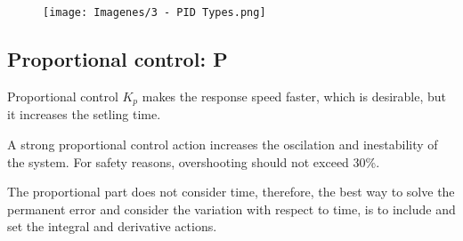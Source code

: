 \begin{figure}[H]
    \centering
    \texttt{[image: Imagenes/3 - PID Types.png]}
\end{figure}

\subsection{Proportional control: P}
Proportional control $K_p$ makes the response speed faster, which is desirable, but it increases the setling time.

A strong proportional control action increases the oscilation and inestability of the system. For safety reasons, overshooting should not exceed 30\%.

The proportional part does not consider time, therefore, the best way to solve the permanent error and consider the variation with respect to time, is to include and set the integral and derivative actions.